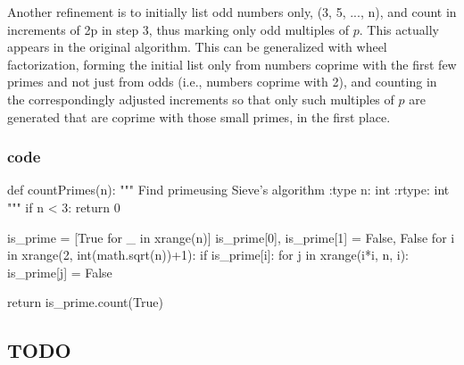 Another refinement is to initially list odd numbers only, (3, 5, ..., n), and count in increments of 2p in step 3, thus marking only odd multiples of $p$. This actually appears in the original algorithm. This can be generalized with wheel factorization, forming the initial list only from numbers coprime with the first few primes and not just from odds (i.e., numbers coprime with 2), and counting in the correspondingly adjusted increments so that only such multiples of $p$ are generated that are coprime with those small primes, in the first place.

\subsubsection{code}
\begin{python}
def countPrimes(n):
    """
    Find primeusing Sieve's algorithm
    :type n: int
    :rtype: int
    """
    if n < 3:
        return 0

    is_prime = [True for _ in xrange(n)]
    is_prime[0], is_prime[1] = False, False
    for i in xrange(2, int(math.sqrt(n))+1):
        if is_prime[i]:
            for j in xrange(i*i, n, i):
                is_prime[j] = False

    return is_prime.count(True)
\end{python}
\subsection{TODO}


